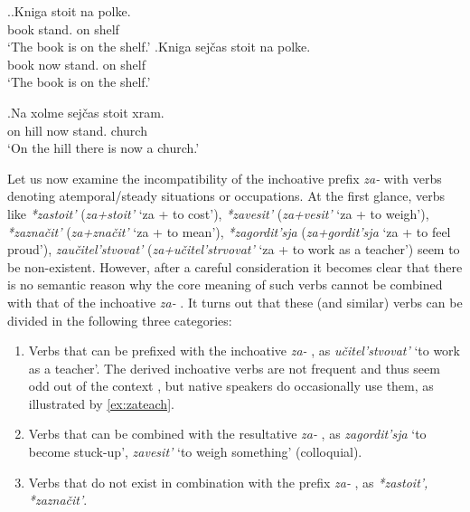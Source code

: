 \ex.\label{ex:stojat':kniga}\ag.Kniga stoit na polke.\\
book stand. on shelf\\
\trans `The book is on the shelf.'
\bg.Kniga sej\v{c}as stoit na polke.\\
book now stand. on shelf\\
\trans `The book is on the shelf.'

\exg.\label{ex:stojat':xram3}Na xolme sej\v{c}as stoit xram.\\
on hill now stand. church\\
\trans `On the hill there is now a church.'

Let us now examine the incompatibility of the inchoative  prefix \textit{za-}   with verbs denoting atemporal/steady situations or occupations. At the first glance, verbs like \textit{*zastoit'} (\textit{za+stoit'} `za + to cost'), \textit{*zavesit'} (\textit{za+vesit'} `za + to weigh'), \textit{*zazna\v{c}it'} (\textit{za+zna\v{c}it'} `za + to mean'), \textit{*zagordit'sja} (\textit{za+gordit'sja} `za + to feel proud'), \textit{zau\v{c}itel'stvovat'} (\textit{za+u\v{c}itel'strvovat'} `za + to work as a teacher') seem to be non-existent. However, after a careful consideration it becomes clear that there is no semantic reason why the core meaning of such verbs cannot be combined with that of the inchoative  \textit{za-}  . It turns out that these (and similar) verbs can be divided in the following three categories:

\begin{enumerate}
\item Verbs that can be prefixed with the inchoative  \textit{za-}  , as \textit{u\v{c}itel'stvovat'} `to work as a teacher'. The derived inchoative  verbs are not frequent and thus seem odd out of the context  , but native speakers do occasionally use them, as illustrated by \ref{ex:zateach}.
\item Verbs that can be combined with the resultative  \textit{za-}  , as \textit{zagordit'sja} `to become stuck-up', \textit{zavesit'} `to weigh something' (colloquial).
\item Verbs that do not exist in combination with the prefix \textit{za-}  , as \textit{*zastoit', *zazna\v{c}it'}.
\end{enumerate}

